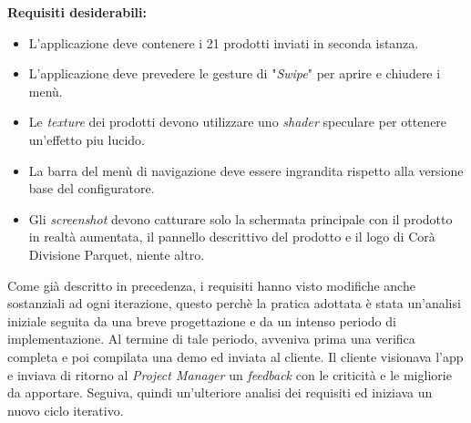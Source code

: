 \textbf{Requisiti desiderabili:}

\begin{itemize}
	\item L'applicazione deve contenere i 21 prodotti inviati in seconda istanza.
	
	\item L'applicazione deve prevedere le gesture di "\textit{Swipe}" per aprire e chiudere i men\`u.
	
	\item Le \textit{texture\gloss} dei prodotti devono utilizzare uno \textit{shader} speculare per ottenere un'effetto piu lucido.
	
	\item La barra del men\`u di navigazione deve essere ingrandita rispetto alla versione base del configuratore.
	
	\item Gli \textit{screenshot} devono catturare solo la schermata principale con il prodotto in realt\`a aumentata, il pannello descrittivo del prodotto e il logo di Cor\`a Divisione Parquet, niente altro.
\end{itemize}

Come gi\`a descritto in precedenza, i requisiti hanno visto modifiche anche sostanziali ad ogni iterazione, questo perch\`e la pratica adottata \`e stata un'analisi iniziale seguita da una breve progettazione e da un intenso periodo di implementazione. Al termine di tale periodo, avveniva prima una verifica completa e poi compilata una demo ed inviata al cliente. Il cliente visionava l'app e inviava di ritorno al \textit{Project Manager} un \textit{feedback} con le criticit\`a e le migliorie da apportare. Seguiva, quindi un'ulteriore analisi dei requisiti ed iniziava un nuovo ciclo iterativo.\\\\


